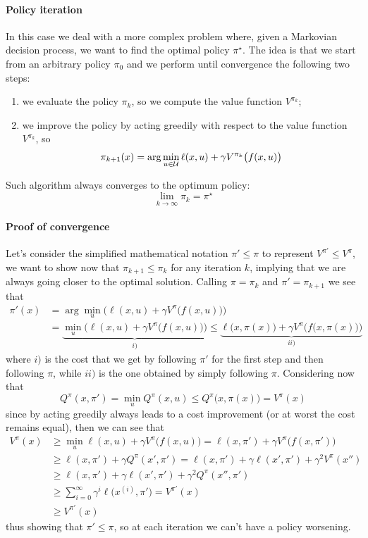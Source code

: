 	\paragraph{Policy iteration} In this case we deal with a more complex problem where, given a Markovian decision process, we want to find the optimal policy $\pi^\star$. The idea is that we start from an arbitrary policy $\pi_0$ and we perform until convergence the following two steps:
	\begin{enumerate}
		\item we evaluate the policy $\pi_k$, so we compute the value function $V^{\pi_k}$;
		\item we improve the policy by acting greedily with respect to the value function $V^{\pi_k}$, so
		\begin{equation}
			\pi_{k+1}(x) = \arg\min_{u\in \mathcal U} \ell(x,u) + \gamma V^{\pi_k}\big(f(x,u)\big)
		\end{equation}
	\end{enumerate}
	Such algorithm always converges to the optimum policy:
	\[ \lim_{k\rightarrow \infty} \pi_k = \pi^\star \]
	
	\paragraph{Proof of convergence} Let's consider the simplified mathematical notation $\pi' \leq \pi$ to represent $V^{\pi'} \leq V^{\pi}$, we want to show now that $\pi_{k+1} \leq \pi_k$ for any iteration $k$, implying that we are always going closer to the optimal solution. Calling $\pi = \pi_k$ and $\pi' = \pi_{k+1}$ we see that 
	\begin{align*}
		\pi'(x) & = \arg\min_u \Big(\ell(x,u) + \gamma V^\pi\big(f(x,u)\big)\Big) \\
		& = \underbrace{\min_u \Big(\ell(x,u) + \gamma V^\pi\big(f(x,u)\big)\Big) }_{i)} \leq \underbrace{\ell\big(x, \pi(x)\big) + \gamma V^\pi \Big(f\big(x, \pi(x)\big)\Big)}_{ii)}
	\end{align*}
	where $i)$ is the cost that we get by following $\pi'$ for the first step and then following $\pi$, while $ii)$ is the one obtained by simply following $\pi$. Considering now that
	\[ Q^\pi(x,\pi') = \min_u Q^\pi(x,u) \leq Q^\pi\big(x, \pi(x)\big) = V^\pi(x) \]
	since by acting greedily always leads to a cost improvement (or at worst the cost remains equal), then we can see that
	\begin{align*}
		V^\pi(x) & \geq \min_u \ell(x,u) + \gamma V^\pi\big(f(x,u)\big) = \ell(x, \pi') + \gamma V^\pi \big(f(x,\pi')\big) \\
		&\geq \ell(x,\pi') + \gamma Q^\pi(x',\pi') = \ell(x,\pi') + \gamma \ell(x',\pi') + \gamma^2 V^\pi(x'') \\
		&\geq \ell(x,\pi') + \gamma \ell(x',\pi') + \gamma^2 Q^\pi(x'',\pi') \\
		& \geq \sum_{i=0}^\infty \gamma^i \ell\big(x^{(i)}, \pi'\big) = V^{\pi'}(x) \\
		& \geq V^{\pi '}(x)
	\end{align*} 
	thus showing that $\pi' \leq \pi$, so at each iteration we can't have a policy worsening.
	
